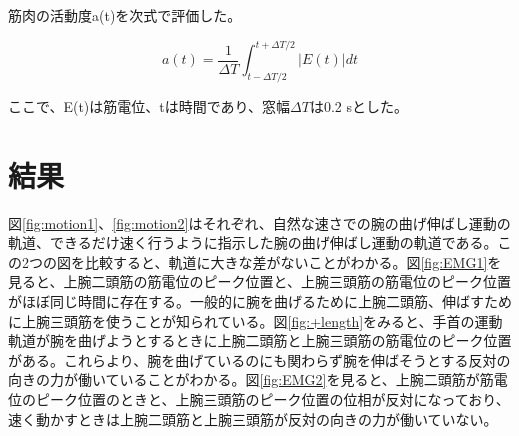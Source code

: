 \documentclass{jsarticle}
\begin{document}
筋肉の活動度a(t)を次式で評価した。

\begin{equation}
a(t)=\frac{1}{\Delta{T}}\int^{t+\Delta{T}/2}_{t-\Delta{T}/2} |E(t)|dt
\end{equation}

ここで、E(t)は筋電位、tは時間であり、窓幅$\Delta{T}$は0.2 sとした。

\section{結果}

図\ref{fig:motion1}、\ref{fig:motion2}はそれぞれ、自然な速さでの腕の曲げ伸ばし運動の軌道、できるだけ速く行うように指示した腕の曲げ伸ばし運動の軌道である。この2つの図を比較すると、軌道に大きな差がないことがわかる。図\ref{fig:EMG1}を見ると、上腕二頭筋の筋電位のピーク位置と、上腕三頭筋の筋電位のピーク位置がほぼ同じ時間に存在する。一般的に腕を曲げるために上腕二頭筋、伸ばすために上腕三頭筋を使うことが知られている。図\ref{fig:+length}をみると、手首の運動軌道が腕を曲げようとするときに上腕二頭筋と上腕三頭筋の筋電位のピーク位置がある。これらより、腕を曲げているのにも関わらず腕を伸ばそうとする反対の向きの力が働いていることがわかる。図\ref{fig:EMG2}を見ると、上腕二頭筋が筋電位のピーク位置のときと、上腕三頭筋のピーク位置の位相が反対になっており、速く動かすときは上腕二頭筋と上腕三頭筋が反対の向きの力が働いていない。
\end{document}
